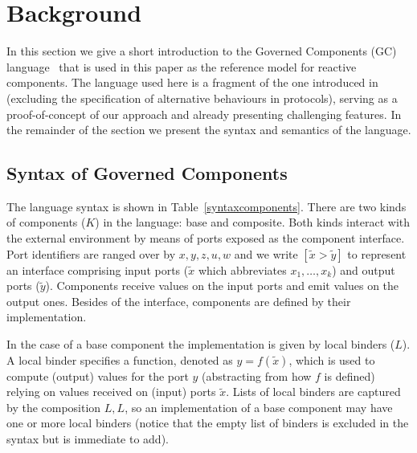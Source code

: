 
\section{Background}

In this section we give a short introduction to the Governed Components (GC) language~\cite{Hugo} that is used in this paper as the reference model for reactive components. The language used here is a fragment of the one introduced in~\cite{Hugo} (excluding the specification of alternative behaviours in protocols), serving as a proof-of-concept of our approach and already presenting challenging features. In the remainder of the section we present the syntax and semantics of the language.



\subsection{Syntax of Governed Components} \label{Syntax of Governed Components}


The language syntax is shown in Table~\ref{syntaxcomponents}. There are two kinds of components ($K$) in the language: base and composite. Both kinds interact with the external environment by means of ports exposed as the component interface. Port identifiers are ranged over by $x,y,z,u,w$ and we write $[\tilde{x}>\tilde{y}]$ to represent an interface comprising input ports ($\tilde{x}$ which abbreviates $x_1, \ldots, x_k$) and output ports ($\tilde{y}$). Components receive values on the input ports and emit values on the output ones. Besides of the interface, components are defined by their implementation. 

In the case of a base component the implementation is given by local binders ($L$). A local binder specifies a function, denoted as $y=f(\tilde{x})$, which is used to compute (output) values for the port $y$  (abstracting from how $f$ is defined) relying on values received on (input) ports $\tilde{x}$. Lists of local binders are captured by the composition $L,L$, so an implementation of a base component may have one or more local binders (notice that the empty list of binders is excluded in the syntax but is immediate to add).


